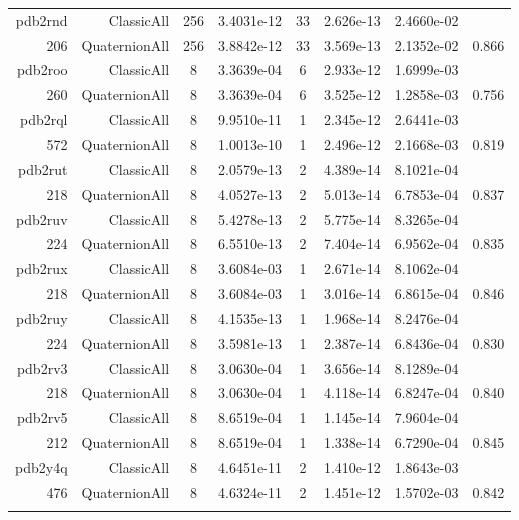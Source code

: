 \begin{xltabular}{\textwidth}{r|rcS[table-format=1.4e+2]cS[table-format=1.3e+2]S[table-format=1.4e+2]S[table-format=-1.3]}
pdb2rnd & ClassicAll & 256 & 3.4031e-12 & 33 & 2.626e-13 & 2.4660e-02 & \\
206 & QuaternionAll & 256 & 3.8842e-12 & 33 & 3.569e-13 & 2.1352e-02 & 0.866\\  \addlinespace
pdb2roo & ClassicAll & 8 & 3.3639e-04 & 6 & 2.933e-12 & 1.6999e-03 & \\
260 & QuaternionAll & 8 & 3.3639e-04 & 6 & 3.525e-12 & 1.2858e-03 & 0.756\\  \addlinespace
pdb2rql & ClassicAll & 8 & 9.9510e-11 & 1 & 2.345e-12 & 2.6441e-03 & \\
572 & QuaternionAll & 8 & 1.0013e-10 & 1 & 2.496e-12 & 2.1668e-03 & 0.819\\  \addlinespace
pdb2rut & ClassicAll & 8 & 2.0579e-13 & 2 & 4.389e-14 & 8.1021e-04 & \\
218 & QuaternionAll & 8 & 4.0527e-13 & 2 & 5.013e-14 & 6.7853e-04 & 0.837\\  \addlinespace
pdb2ruv & ClassicAll & 8 & 5.4278e-13 & 2 & 5.775e-14 & 8.3265e-04 & \\
224 & QuaternionAll & 8 & 6.5510e-13 & 2 & 7.404e-14 & 6.9562e-04 & 0.835\\  \addlinespace
pdb2rux & ClassicAll & 8 & 3.6084e-03 & 1 & 2.671e-14 & 8.1062e-04 & \\
218 & QuaternionAll & 8 & 3.6084e-03 & 1 & 3.016e-14 & 6.8615e-04 & 0.846\\  \addlinespace
pdb2ruy & ClassicAll & 8 & 4.1535e-13 & 1 & 1.968e-14 & 8.2476e-04 & \\
224 & QuaternionAll & 8 & 3.5981e-13 & 1 & 2.387e-14 & 6.8436e-04 & 0.830\\  \addlinespace
pdb2rv3 & ClassicAll & 8 & 3.0630e-04 & 1 & 3.656e-14 & 8.1289e-04 & \\
218 & QuaternionAll & 8 & 3.0630e-04 & 1 & 4.118e-14 & 6.8247e-04 & 0.840\\  \addlinespace
pdb2rv5 & ClassicAll & 8 & 8.6519e-04 & 1 & 1.145e-14 & 7.9604e-04 & \\
212 & QuaternionAll & 8 & 8.6519e-04 & 1 & 1.338e-14 & 6.7290e-04 & 0.845\\  \addlinespace
pdb2y4q & ClassicAll & 8 & 4.6451e-11 & 2 & 1.410e-12 & 1.8643e-03 & \\
476 & QuaternionAll & 8 & 4.6324e-11 & 2 & 1.451e-12 & 1.5702e-03 & 0.842\\  \addlinespace
\end{xltabular}
